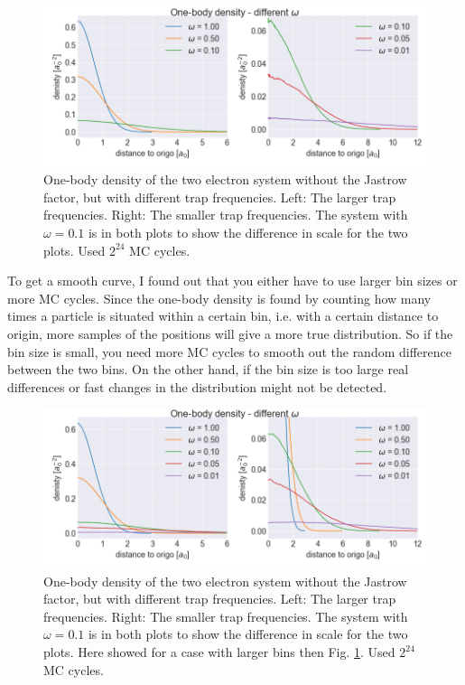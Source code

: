 \begin{figure}[H]
\center
\includegraphics[width=0.85\linewidth]{../Results/one_body_density_no_interaction_2p}\caption{One-body density of the two electron system without the Jastrow factor, but with different trap frequencies. Left: The larger trap frequencies. Right: The smaller trap frequencies. The system with $\omega = 0.1$ is in both plots to show the difference in scale for the two plots. Used $2^{24}$ MC cycles. }\label{fig:one_body_density_no_interaction_2p}
\end{figure}

To get a smooth curve, I found out that you either have to use larger bin sizes or more MC cycles. Since the one-body density is found by counting how many times a particle is situated within a certain bin, i.e. with a certain distance to origin, more samples of the positions will give a more true distribution. So if the bin size is small, you need more MC cycles to smooth out the random difference between the two bins. On the other hand, if the bin size is too large real differences or fast changes in the distribution might not be detected.

\begin{figure}[H]
\center
\includegraphics[width=0.85\linewidth]{../Results/one_body_density_no_interaction_2p_few_points}\caption{One-body density of the two electron system without the Jastrow factor, but with different trap frequencies. Left: The larger trap frequencies. Right: The smaller trap frequencies. The system with $\omega = 0.1$ is in both plots to show the difference in scale for the two plots. Here showed for a case with larger bins then Fig. \ref{fig:one_body_density_no_interaction_2p}. Used $2^{24}$ MC cycles.}\label{fig:one_body_density_no_interaction_2p_fewer_bins}
\end{figure}

